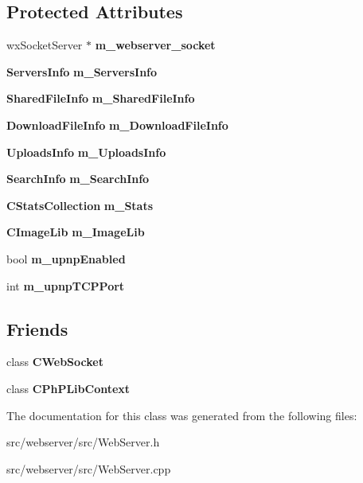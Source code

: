 \subsection*{Protected Attributes}
\begin{DoxyCompactItemize}
\item 
wxSocketServer $\ast$ {\bfseries m\_\-webserver\_\-socket}\label{classCWebServerBase_a1f80b46a729278c8dd1c159ebb48ab6b}

\item 
{\bf ServersInfo} {\bfseries m\_\-ServersInfo}\label{classCWebServerBase_a5a4869cf9979d50427aca5fcfefd3d4a}

\item 
{\bf SharedFileInfo} {\bfseries m\_\-SharedFileInfo}\label{classCWebServerBase_a5e9afa778c37c512188202d1321b8f84}

\item 
{\bf DownloadFileInfo} {\bfseries m\_\-DownloadFileInfo}\label{classCWebServerBase_a2b2d20496015ea76a221020ca502eef0}

\item 
{\bf UploadsInfo} {\bfseries m\_\-UploadsInfo}\label{classCWebServerBase_aa1e03c06851af8637883446def44342b}

\item 
{\bf SearchInfo} {\bfseries m\_\-SearchInfo}\label{classCWebServerBase_acde2518ac2e9c42d0cf8e00bbc59e780}

\item 
{\bf CStatsCollection} {\bfseries m\_\-Stats}\label{classCWebServerBase_ac7df6c42397ca967d1a1e3154be409a2}

\item 
{\bf CImageLib} {\bfseries m\_\-ImageLib}\label{classCWebServerBase_a3c50242c1e05a7d32f6780f092e8f9c7}

\item 
bool {\bfseries m\_\-upnpEnabled}\label{classCWebServerBase_a302b5060976ebc2fa13f9b0d176f20a1}

\item 
int {\bfseries m\_\-upnpTCPPort}\label{classCWebServerBase_a8fb7f1201dc1ba7bc338cda70d465970}

\end{DoxyCompactItemize}
\subsection*{Friends}
\begin{DoxyCompactItemize}
\item 
class {\bf CWebSocket}\label{classCWebServerBase_a573927b581ff7c43f3c58e712edaf456}

\item 
class {\bfseries CPhPLibContext}\label{classCWebServerBase_a281a6221aeb986b2361714a5695572f5}

\end{DoxyCompactItemize}


The documentation for this class was generated from the following files:\begin{DoxyCompactItemize}
\item 
src/webserver/src/WebServer.h\item 
src/webserver/src/WebServer.cpp\end{DoxyCompactItemize}
